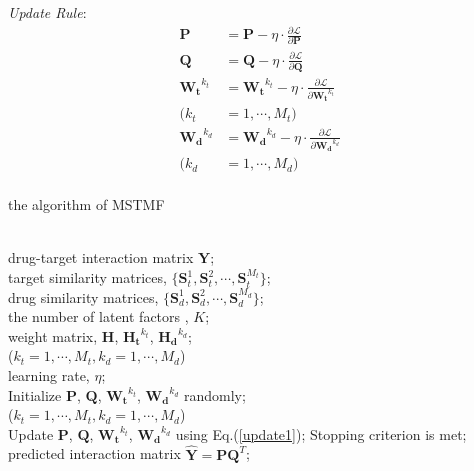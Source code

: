 \documentclass{article}
\begin{document}
\textit{Update Rule}:
\begin{equation}\label{update1} %
\begin{split}
\bm{P} &= \bm{P} - \eta\cdot\frac{\partial \mathcal{L}}{\partial \bm{P}}\\
\bm{Q} &= \bm{Q} - \eta\cdot\frac{\partial \mathcal{L}}{\partial \bm{Q}}\\
\bm{W_t}^{k_t} &= \bm{W_t}^{k_t} - \eta\cdot\frac{\partial \mathcal{L}}{\partial \bm{W_t}^{k_t}}\\ (k_t &= 1,\cdots,M_t) \\
\bm{W_d}^{k_d} &= \bm{W_d}^{k_d} - \eta\cdot\frac{\partial \mathcal{L}}{\partial \bm{W_d}^{k_d}}\\ (k_d &= 1,\cdots,M_d) \\
\end{split}
\end{equation}
\renewcommand{\algorithmicrequire}{\textbf{Input:}}  %
\renewcommand{\algorithmicensure}{\textbf{Output:}}  %
\begin{algorithm}[htb] 
\caption{ the algorithm of MSTMF } 
\label{alg:Framwork} 
\begin{algorithmic}[1] 
\REQUIRE ~~\\ %
drug-target interaction matrix $\bm{Y}$;\\
target similarity matrices, $\{\bm{S}_t^1,\bm{S}_t^2,\cdots,\bm{S}_t^{M_t}\}$; \\
drug similarity matrices, $\{\bm{S}_d^1,\bm{S}_d^2,\cdots,\bm{S}_d^{M_d}\}$; \\
the number of latent factors , $K$;\\
weight matrix, $\bm{H}$, $\bm{H_t}^{k_t}$, $\bm{H_d}^{k_d}$; \\
(${k_t}=1,\cdots, M_t, {k_d}=1,\cdots, M_d$)\\
learning rate, $\eta$;\\

\STATE Initialize $\bm{P}$, $\bm{Q}$, $\bm{W_t}^{k_t}$, $\bm{W_d}^{k_d}$ randomly;\\
(${k_t}=1,\cdots, M_t, {k_d}=1,\cdots, M_d$)\\
\REPEAT 
\STATE Update $\bm{P}$, $\bm{Q}$, $\bm{W_t}^{k_t} $, $\bm{W_d}^{k_d} $  using Eq.(\ref{update1}); 
\UNTIL Stopping criterion is met;
\ENSURE ~~\\ %
predicted interaction matrix $\bm{\hat{Y}}=\bm{P}\bm{Q}^T$; %
\end{algorithmic}
\end{algorithm}
\end{document}
